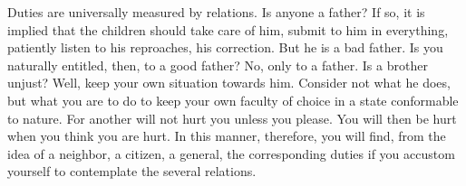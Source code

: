 Duties are universally measured by relations. Is  anyone a father? If so, it is
implied that the children should take care of him, submit to him in everything,
patiently listen to his reproaches, his correction.  But he is a bad father. Is
you naturally  entitled, then, to  a good  father? No, only  to a father.  Is a
brother unjust? Well, keep your own situation towards him. Consider not what he
does, but  what you are  to do to  keep your own faculty  of choice in  a state
conformable to  nature. For another  will not hurt  you unless you  please. You
will then be hurt  when you think you are hurt. In  this manner, therefore, you
will find, from the idea of a neighbor, a citizen, a general, the corresponding
duties if you accustom yourself to contemplate the several relations.
